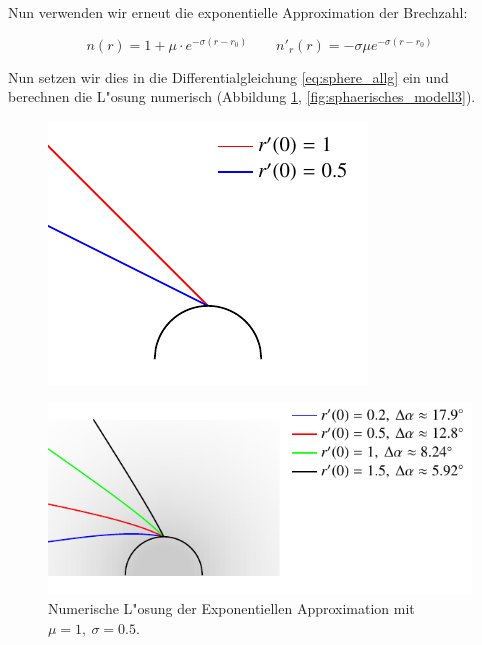 \begin{refsection}
Nun verwenden wir erneut die exponentielle Approximation der Brechzahl: 

$$n(r) = 1 + \mu \cdot e^{-\sigma (r - r_0)} \qquad n'_r(r) = -\sigma \mu e^{-\sigma (r - r_0)}$$

Nun setzen wir dies in die Differentialgleichung \ref{eq:sphere_allg} ein und berechnen die L"osung numerisch (Abbildung \ref{fig:sphaerisches_modell2}, \ref{fig:sphaerisches_modell3}). 

\begin{figure}
\centering
\includegraphics[scale=1]{licht/standalone/fig_sphere_simulation_vacuum.pdf}
\end{figure}

\begin{figure}
\centering
\includegraphics[scale=1]{licht/standalone/fig_sphere_simulation1.pdf}
\caption{Numerische L"osung der Exponentiellen Approximation mit $\mu = 1, \: \sigma = 0.5$. 
\label{fig:sphaerisches_modell2}}
\end{figure}


\end{refsection}
